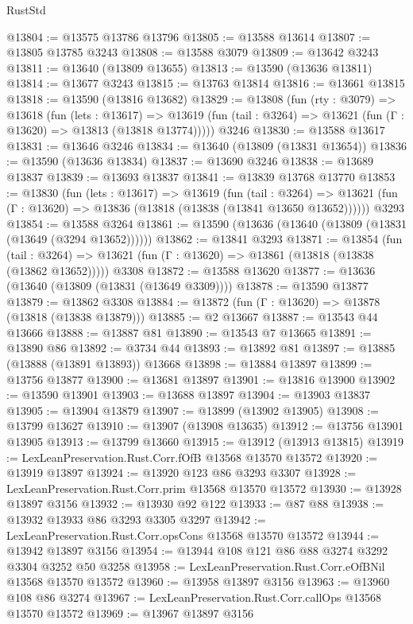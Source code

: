 \begin{lexlean}{RustStd}
\begin{coremodule}
@13804 := @13575 @13786 @13796
@13805 := @13588 @13614
@13807 := @13805 @13785 @3243
@13808 := @13588 @3079
@13809 := @13642 @3243
@13811 := @13640 (@13809 @13655)
@13813 := @13590 (@13636 @13811)
@13814 := @13677 @3243
@13815 := @13763 @13814
@13816 := @13661 @13815
@13818 := @13590 (@13816 @13682)
@13829 := @13808
    (fun (rty : @3079) =>
    @13618
      (fun (lets : @13617) =>
      @13619 (fun (tail : @3264) => @13621 (fun (Γ : @13620) => @13813 (@13818 @13774)))))
    @3246
@13830 := @13588 @13617
@13831 := @13646 @3246
@13834 := @13640 (@13809 (@13831 @13654))
@13836 := @13590 (@13636 @13834)
@13837 := @13690 @3246
@13838 := @13689 @13837
@13839 := @13693 @13837
@13841 := @13839 @13768 @13770
@13853 := @13830
    (fun (lets : @13617) =>
    @13619
      (fun (tail : @3264) =>
      @13621 (fun (Γ : @13620) => @13836 (@13818 (@13838 (@13841 @13650 @13652))))))
    @3293
@13854 := @13588 @3264
@13861 := @13590 (@13636 (@13640 (@13809 (@13831 (@13649 (@3294 @13652))))))
@13862 := @13841 @3293
@13871 := @13854
    (fun (tail : @3264) => @13621 (fun (Γ : @13620) => @13861 (@13818 (@13838 (@13862 @13652)))))
    @3308
@13872 := @13588 @13620
@13877 := @13636 (@13640 (@13809 (@13831 (@13649 @3309))))
@13878 := @13590 @13877
@13879 := @13862 @3308
@13884 := @13872 (fun (Γ : @13620) => @13878 (@13818 (@13838 @13879)))
@13885 := @2 @13667
@13887 := @13543 @44 @13666
@13888 := @13887 @81
@13890 := @13543 @7 @13665
@13891 := @13890 @86
@13892 := @3734 @44
@13893 := @13892 @81
@13897 := @13885 (@13888 (@13891 @13893)) @13668
@13898 := @13884 @13897
@13899 := @13756 @13877
@13900 := @13681 @13897
@13901 := @13816 @13900
@13902 := @13590 @13901
@13903 := @13688 @13897
@13904 := @13903 @13837
@13905 := @13904 @13879
@13907 := @13899 (@13902 @13905)
@13908 := @13799 @13627
@13910 := @13907 (@13908 @13635)
@13912 := @13756 @13901 @13905
@13913 := @13799 @13660
@13915 := @13912 (@13913 @13815)
@13919 := LexLeanPreservation.Rust.Corr.fOfB @13568 @13570 @13572
@13920 := @13919 @13897
@13924 := @13920 @123 @86 @3293 @3307
@13928 := LexLeanPreservation.Rust.Corr.prim @13568 @13570 @13572
@13930 := @13928 @13897 @3156
@13932 := @13930 @92 @122
@13933 := @87 @88
@13938 := @13932 @13933 @86 @3293 @3305 @3297
@13942 := LexLeanPreservation.Rust.Corr.opsCons @13568 @13570 @13572
@13944 := @13942 @13897 @3156
@13954 := @13944 @108 @121 @86 @88 @3274 @3292 @3304 @3252 @50 @3258
@13958 := LexLeanPreservation.Rust.Corr.eOfBNil @13568 @13570 @13572
@13960 := @13958 @13897 @3156
@13963 := @13960 @108 @86 @3274
@13967 := LexLeanPreservation.Rust.Corr.callOps @13568 @13570 @13572
@13969 := @13967 @13897 @3156

\end{coremodule}
\end{lexlean}

